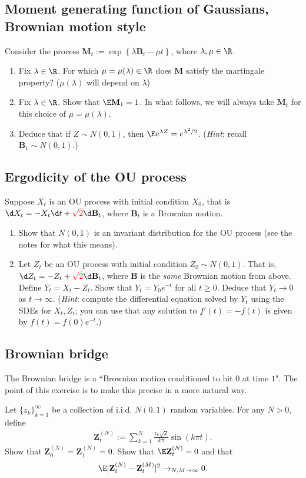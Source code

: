 \documentclass[12pt,reqno]{amsart}
\theoremstyle{definition}
\theoremstyle{remark}
\numberwithin{equation}{section}
\begin{document}
\subsection{Moment generating function of Gaussians, Brownian motion style}
Consider the process $\mathbf{M}_{t}:=\exp\left\{\lambda\mathbf{B}_{t}-\mu t\right\}$, where $\lambda,\mu\in\R$.
\begin{enumerate}
\item Fix $\lambda\in\R$. For which $\mu=\mu(\lambda)\in\R$ does $\mathbf{M}$ satisfy the martingale property? ($\mu(\lambda)$ will depend on $\lambda$)
\item Fix $\lambda\in\R$. Show that $\E\mathbf{M}_{1}=1$. In what follows, we will always take $\mathbf{M}_{t}$ for this choice of $\mu=\mu(\lambda)$.
\item Deduce that if $Z\sim N(0,1)$, then $\E e^{\lambda Z}=e^{\lambda^{2}/2}$. (\emph{Hint}: recall $\mathbf{B}_{1}\sim N(0,1)$.)
\end{enumerate}
\subsection{Ergodicity of the OU process}
Suppose $X_{t}$ is an OU process with initial condition $X_{0}$, that is $\d X_{t}=- X_{t}\d t+{\color{red}\sqrt{2}}\d\mathbf{B}_{t}$, where $\mathbf{B}_{t}$ is a Brownian motion.
\begin{enumerate}
\item Show that $N(0,1)$ is an invariant distribution for the OU process (see the notes for what this means).
\item Let $Z_{t}$ be an OU process with initial condition $Z_{0}\sim N(0,1)$. That is, $\d Z_{t}=- Z_{t}+{\color{red}\sqrt{2}}\d\mathbf{B}_{t}$, where $\mathbf{B}$ is the \emph{same} Brownian motion from above. Define $Y_{t}=X_{t}-Z_{t}$. Show that $Y_{t}=Y_{0}e^{-t}$ for all $t\geq0$. Deduce that $Y_{t}\to0$ as $t\to\infty$. (\emph{Hint}: compute the differential equation solved by $Y_{t}$ using the SDEs for $X_{t},Z_{t}$; you can use that any solution to $f'(t)=-f(t)$ is given by $f(t)=f(0)e^{-t}$.)
\end{enumerate}
\subsection{Brownian bridge}
The Brownian bridge is a ``Brownian motion conditioned to hit $0$ at time $1$". The point of this exercise is to make this precise in a more natural way. 

Let $\{z_{k}\}_{k=1}^{\infty}$ be a collection of i.i.d. $N(0,1)$ random variables. For any $N>0$, define 
%
\begin{align*}
\mathbf{Z}^{(N)}_{t}:=\sum_{k=1}^{N}\frac{z_{k}\sqrt{2}}{k\pi}\sin(k\pi t).
\end{align*}
%
Show that $\mathbf{Z}^{(N)}_{0}=\mathbf{Z}^{(N)}_{1}=0$. Show that $\E\mathbf{Z}^{(N)}_{t}=0$ and that
%
\begin{align*}
\E|\mathbf{Z}^{(N)}_{t}-\mathbf{Z}^{(M)}_{t}|^{2}\to_{N,M\to\infty}0.
\end{align*}
%
\end{document}
